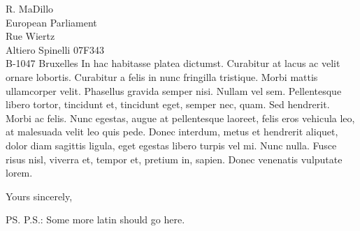 \documentclass[a4paper,10pt]{letter}
\begin{document}
\begin{letter}{
    R. MaDillo\\
    European Parliament\\
    Rue Wiertz\\
    Altiero Spinelli 07F343\\
    B-1047 Bruxelles 
  }
  In hac habitasse platea dictumst. Curabitur at lacus ac velit ornare lobortis. 
  Curabitur a felis in nunc fringilla tristique. Morbi mattis ullamcorper velit. 
  Phasellus gravida semper nisi. Nullam vel sem. Pellentesque libero tortor, 
  tincidunt et, tincidunt eget, semper nec, quam. Sed hendrerit. Morbi ac felis. 
  Nunc egestas, augue at pellentesque laoreet, felis eros vehicula leo, at 
  malesuada velit leo quis pede. Donec interdum, metus et hendrerit aliquet, 
  dolor diam sagittis ligula, eget egestas libero turpis vel mi. Nunc nulla. 
  Fusce risus nisl, viverra et, tempor et, pretium in, sapien. Donec venenatis 
  vulputate lorem.

%
  \closing{Yours sincerely,}
%
  \ps{P.S.: Some more latin should go here.}
\end{letter}
\end{document}
